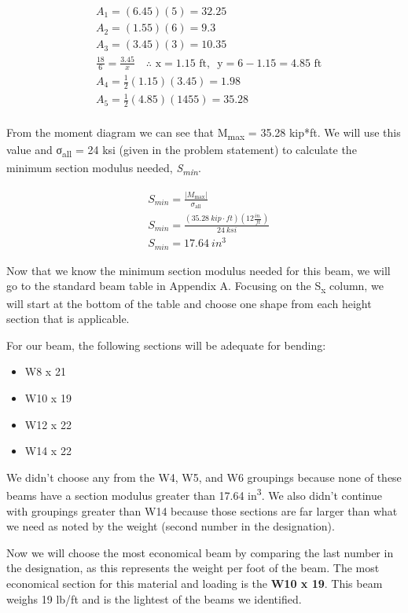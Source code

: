 \documentclass[
  letterpaper,
  DIV=11,
  numbers=noendperiod]{scrreprt}
\begin{document}
\begin{tcolorbox}
\begin{tcolorbox}
\[
\begin{aligned}
& A_1=(6.45)(5)=32.25 \\
& A_2=(1.55)(6)=9.3 \\
& A_3=(3.45)(3)=10.35 \\
& \frac{18}{6}=\frac{3.45}{x} \quad \therefore \text{ x}=1.15 \text{ ft, } \text{ y}=6-1.15=4.85 \text{ ft} \\
& A_4=\frac{1}{2}(1.15)(3.45)=1.98 \\
& A_5=\frac{1}{2}(4.85)(1455)=35.28 \\
&
\end{aligned}
\]

From the moment diagram we can see that
\textbar M\textsubscript{max}\textbar{} = 35.28 kip*ft. We will use this
value and σ\textsubscript{all} = 24 ksi (given in the problem statement)
to calculate the minimum section modulus needed,
\emph{S\textsubscript{min}}.

\[
\begin{aligned}
& S_{min}=\frac{|M_\text{max}|}{\sigma_\text{all}} \\
& S_{min}=\frac{(35.28{~kip}\cdot{ft})(12\frac{in.}{ft})}{24{~ksi}} \\
& S_{min}=17.64{~in}^3
\end{aligned}
\]

Now that we know the minimum section modulus needed for this beam, we
will go to the standard beam table in Appendix A. Focusing on the
S\textsubscript{x} column, we will start at the bottom of the table and
choose one shape from each height section that is applicable.

For our beam, the following sections will be adequate for bending:

\begin{itemize}
\item
  W8 x 21
\item
  W10 x 19
\item
  W12 x 22
\item
  W14 x 22
\end{itemize}

We didn't choose any from the W4, W5, and W6 groupings because none of
these beams have a section modulus greater than 17.64
in\textsuperscript{3}. We also didn't continue with groupings greater
than W14 because those sections are far larger than what we need as
noted by the weight (second number in the designation).

Now we will choose the most economical beam by comparing the last number
in the designation, as this represents the weight per foot of the beam.
The most economical section for this material and loading is the
\textbf{W10 x 19}. This beam weighs 19 lb/ft and is the lightest of the
beams we identified.

\end{tcolorbox}

\end{tcolorbox}
\end{document}
